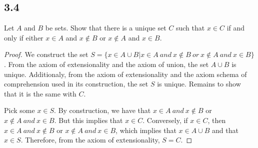 \subsection*{3.4} Let $A$ and $B$ be sets. Show that there is a unique set $C$ such that $x \in C$ if and only if either $x \in A$ and $x \notin B$ or $x \notin A$ and $x \in B$.

\begin{proof}
We construct the set $S = \{x \in A \cup B | x \in A~and~x \notin B~or~x \notin A~and~x \in B\}$. From the axiom of extensionality and the axiom of union, the set $A \cup B$ is unique. Additionaly, from the axiom of extensionality and the axiom schema of comprehension used in its construction, the set $S$ is unique. Remains to show that it is the same with $C$.

Pick some $x \in S$. By construction, we have that $x \in A~and~x \notin B$ or $x \notin A~and~x \in B$. But this implies that $x \in C$. Conversely, if $x \in C$, then $x \in A~and~x \notin B$ or $x \notin A~and~x \in B$, which implies that $x \in A \cup B$ and that $x \in S$. Therefore, from the axiom of extensionality, $S = C$.
\end{proof}

